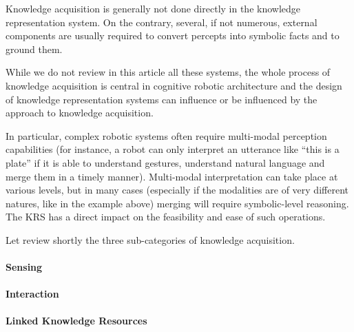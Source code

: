 \documentclass[a4paper, twocolumn]{article}
\begin{document}
Knowledge acquisition is generally not done directly in the knowledge
representation system. On the contrary, several, if not numerous, external
components are usually required to convert percepts into symbolic facts and to
ground them.

While we do not review in this article all these systems, the whole process of
knowledge acquisition is central in cognitive robotic architecture and the
design of knowledge representation systems can influence or be influenced by
the approach to knowledge acquisition.

In particular, complex robotic systems often require multi-modal perception
capabilities (for instance, a robot can only interpret an utterance like ``this
is a plate'' if it is able to understand gestures, understand natural language
and merge them in a timely manner). Multi-modal interpretation can take place
at various levels, but in many cases (especially if the modalities are of very
different natures, like in the example above) merging will require
symbolic-level reasoning. The KRS has a direct impact on the feasibility and
ease of such operations.

Let review shortly the three sub-categories of knowledge acquisition.

\begin{scriptsize}
\begin{center}
\end{center}
\end{scriptsize}

\paragraph{Sensing}

\paragraph{Interaction}

\paragraph{Linked Knowledge Resources}
\end{document}
